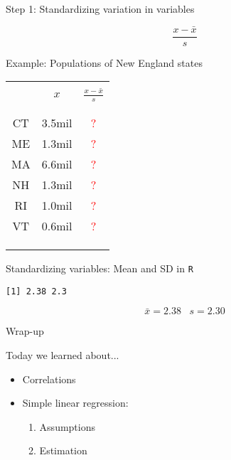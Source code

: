 \documentclass{beamer}
\begin{document}
\begin{frame}{Step 1: Standardizing variation in variables}


\Large{$$ \frac{x-\bar{x}}{s} $$}


\large	Example: Populations of New England states
\begin{center}\footnotesize{
		\begin{tabular}{ccc}
			\\[-1.8ex]\hline  \\[-1.8ex] 
			\hline \\[-1.8ex]
			& $x$ & $\frac{x-\bar{x}}{s}$ \\ 
			\\[-1.8ex]\hline 
			\\[-1.8ex]
			CT & 3.5mil &\textcolor{red}{?}\\
			ME & 1.3mil &\textcolor{red}{?}\\
			MA & 6.6mil & \textcolor{red}{?}\\
			NH & 1.3mil &\textcolor{red}{?}\\
			RI & 1.0mil &\textcolor{red}{?}\\
			VT & 0.6mil &\textcolor{red}{?} \\
			\\[-1.8ex]\hline  \\[-1.8ex] 
			\hline \\
		\end{tabular}
}\end{center}
\end{frame}

\begin{frame}{Standardizing variables: Mean and SD in \texttt{R}}

 
\vspace{.5cm}
\texttt{[1] 2.38 2.3}
\vspace{.5cm}

\Large{$$\bar{x}=2.38 \hspace{10pt} s=2.30$$}

\end{frame}


\begin{frame}{Wrap-up}
	
	\begin{block}{Today we learned about...}	
		\begin{itemize}
			\item Correlations  \vspace{.25cm} 
			\item Simple linear regression: \vspace{.25cm}
			\begin{enumerate}
				\item Assumptions \vspace{.25cm}
				\item Estimation
			\end{enumerate}
			
		\end{itemize}
		
		
	\end{block}
\end{frame}
\end{document}
